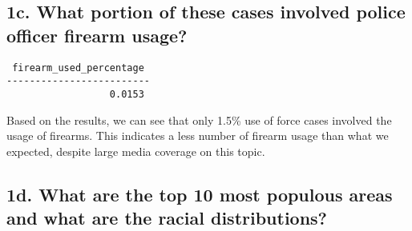 \documentclass[10pt]{article}
\begin{document}
\subsection*{1c. What portion of these cases involved police officer firearm usage?}

\begin{verbatim}
 firearm_used_percentage
-------------------------
                  0.0153
\end{verbatim}

Based on the results, we can see that only 1.5\% use of force cases involved the usage of firearms. This indicates a less number of firearm usage than what we expected, despite large media coverage on this topic.


\subsection*{1d. What are the top 10 most populous areas and what are the racial distributions?}
\end{document}
